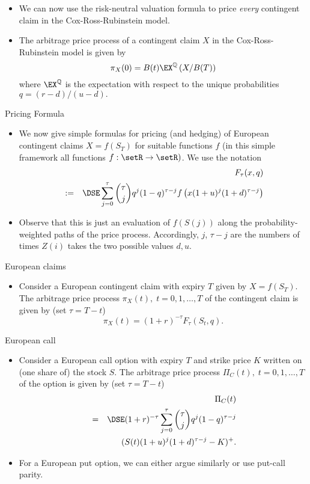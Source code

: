 \begin{itemize}
  \item We can now use the risk-neutral valuation formula to price {\it
every} contingent claim in the Cox-Ross-Rubinstein model.
  \item The arbitrage price process of a contingent claim $X$ in the
Cox-Ross-Rubinstein model is given by
$$
\pi_X(0) = B(t) \EX^\mathbb{Q}\left( X/B(T)\right)
$$
where $\EX^\mathbb{Q}$ is the expectation with respect to the
unique probabilities
$q= (r-d)/(u-d).$
\end{itemize}




{Pricing Formula}


\begin{itemize}
  \item We now give simple formulas for pricing (and hedging) of European
contingent claims $X=f(S_T)$ for suitable functions $f$ (in this
simple framework all functions $f:\setR \rightarrow \setR)$. We
use the notation
\begin{eqnarray}\label{BinomialF}
&& F_\tau(x,q)\\\nonumber
&:=&\DSE \sum_{j=0}^\tau {\tau \choose j} q^j (1-q)^{\tau-j}
f\left(x(1+u)^j(1+d)^{\tau-j}\right)
\end{eqnarray}
\item Observe that this is just an evaluation of $f(S(j))$ along the
probability-weighted paths of the price process. Accordingly, $j$,
$\tau-j$ are the numbers of times $Z(i)$ takes the two possible
values $d, u$.
\end{itemize}



{European claims}
\begin{itemize}
  \item Consider a European contingent claim with expiry $T$ given by
$X=f(S_T)$. The arbitrage price process $\pi_X(t), \; t=0, 1,
\ldots, T$ of the contingent claim is given by (set $\tau=T-t$)
\begin{equation}\label{crrcontclaimprice}
\pi_X(t) = (1+r)^{-\tau} F_\tau(S_t,q).
\end{equation}
\end{itemize}




{European call}
\begin{itemize}
  \item Consider a European call option with expiry $T$ and strike price
$K$ written on (one share of) the stock $S$. The arbitrage price
process $\Pi_C(t), \; t=0, 1, \ldots, T$ of the option is given by
(set $\tau=T-t$)
\begin{eqnarray}\label{crrcallprice}
&& \Pi_C(t)\\\nonumber
&=&\DSE (1+r)^{-\tau} \sum_{j=0}^{\tau} {{\tau} \choose j}
{q}^j (1 - q)^{\tau-j}\\\nonumber
&&(S(t) (1+u)^j (1+d)^{\tau-j} - K)^+.
\end{eqnarray}
\item For a European put option, we can either argue similarly or use
put-call parity.
\end{itemize}



